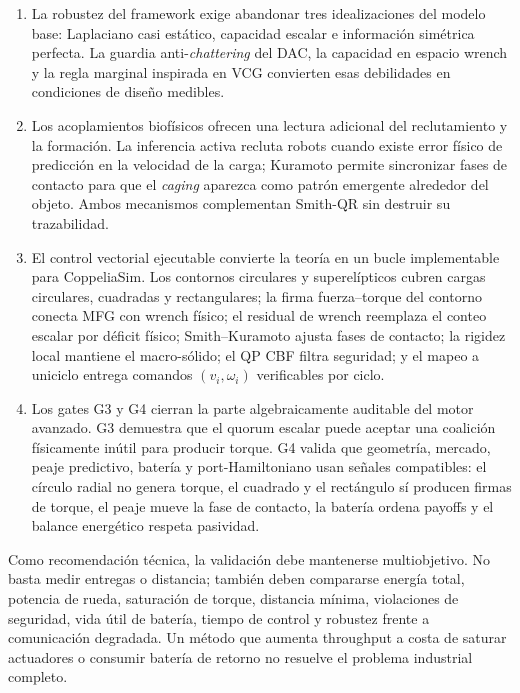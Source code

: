 \begin{enumerate}
  \item La robustez del framework exige abandonar tres idealizaciones del modelo base:
  Laplaciano casi estático, capacidad escalar e información simétrica perfecta. La
  guardia anti-\emph{chattering} del DAC, la capacidad en espacio wrench y la regla
  marginal inspirada en VCG convierten esas debilidades en condiciones de diseño
  medibles.

  \item Los acoplamientos biofísicos ofrecen una lectura adicional del reclutamiento y
  la formación. La inferencia activa recluta robots cuando existe error físico de
  predicción en la velocidad de la carga; Kuramoto permite sincronizar fases de contacto
  para que el \emph{caging} aparezca como patrón emergente alrededor del objeto. Ambos
  mecanismos complementan Smith-QR sin destruir su trazabilidad.

  \item El control vectorial ejecutable convierte la teoría en un bucle implementable
  para CoppeliaSim. Los contornos circulares y superelípticos cubren cargas circulares,
  cuadradas y rectangulares; la firma fuerza--torque del contorno conecta MFG con wrench
  físico; el residual de wrench reemplaza el conteo escalar por déficit físico;
  Smith--Kuramoto ajusta fases de contacto; la rigidez local mantiene el macro-sólido; el
  QP CBF filtra seguridad; y el mapeo a uniciclo entrega comandos $(v_i,\omega_i)$
  verificables por ciclo.

  \item Los gates G3 y G4 cierran la parte algebraicamente auditable del motor avanzado.
  G3 demuestra que el quorum escalar puede aceptar una coalición físicamente inútil para
  producir torque. G4 valida que geometría, mercado, peaje predictivo, batería y
  port-Hamiltoniano usan señales compatibles: el círculo radial no genera torque, el
  cuadrado y el rectángulo sí producen firmas de torque, el peaje mueve la fase de
  contacto, la batería ordena payoffs y el balance energético respeta pasividad.
\end{enumerate}

Como recomendación técnica, la validación debe mantenerse multiobjetivo. No basta medir
entregas o distancia; también deben compararse energía total, potencia de rueda,
saturación de torque, distancia mínima, violaciones de seguridad, vida útil de batería,
tiempo de control y robustez frente a comunicación degradada. Un método que aumenta
throughput a costa de saturar actuadores o consumir batería de retorno no resuelve el
problema industrial completo.

